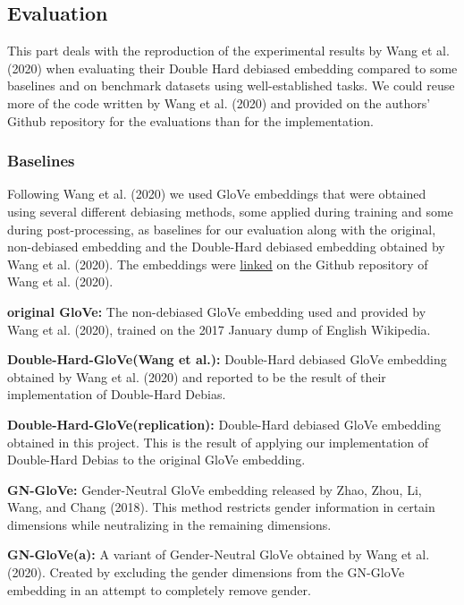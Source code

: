 \documentclass[
  english,
  man,floatsintext]{apa6}
\begin{document}
\hypertarget{evaluation}{%
\subsection{Evaluation}\label{evaluation}}

This part deals with the reproduction of the experimental results by Wang et al. (2020) when evaluating their Double Hard debiased embedding compared to some baselines and on benchmark datasets using well-established tasks. We could reuse more of the code written by Wang et al. (2020) and provided on the authors' Github repository for the evaluations than for the implementation.

\hypertarget{baselines}{%
\subsubsection{Baselines}\label{baselines}}

Following Wang et al. (2020) we used GloVe embeddings that were obtained using several different debiasing methods, some applied during training and some during post-processing, as baselines for our evaluation along with the original, non-debiased embedding and the Double-Hard debiased embedding obtained by Wang et al. (2020). The embeddings were \href{http://www.cs.virginia.edu/~tw8cb/word_embeddings/}{linked} on the Github repository of Wang et al. (2020).

\textbf{original GloVe:} The non-debiased GloVe embedding used and provided by Wang et al. (2020), trained on the 2017 January dump of English Wikipedia.

\textbf{Double-Hard-GloVe(Wang et al.):} Double-Hard debiased GloVe embedding obtained by Wang et al. (2020) and reported to be the result of their implementation of Double-Hard Debias.

\textbf{Double-Hard-GloVe(replication):} Double-Hard debiased GloVe embedding obtained in this project. This is the result of applying our implementation of Double-Hard Debias to the original GloVe embedding.

\textbf{GN-GloVe:} Gender-Neutral GloVe embedding released by Zhao, Zhou, Li, Wang, and Chang (2018). This method restricts gender information in certain dimensions while neutralizing in the remaining dimensions.

\textbf{GN-GloVe(a):} A variant of Gender-Neutral GloVe obtained by Wang et al. (2020). Created by excluding the gender dimensions from the GN-GloVe embedding in an attempt to completely remove gender.
\end{document}
